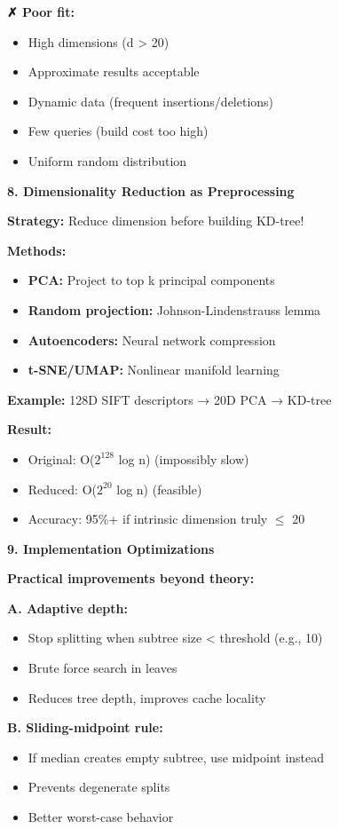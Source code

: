 \documentclass[12pt]{article}
\begin{document}
\begin{explanation}
\textbf{✗ Poor fit:}
\begin{itemize}
    \item High dimensions (d > 20)
    \item Approximate results acceptable
    \item Dynamic data (frequent insertions/deletions)
    \item Few queries (build cost too high)
    \item Uniform random distribution
\end{itemize}

\textbf{8. Dimensionality Reduction as Preprocessing}

\textbf{Strategy:} Reduce dimension before building KD-tree!

\textbf{Methods:}
\begin{itemize}
    \item \textbf{PCA:} Project to top k principal components
    \item \textbf{Random projection:} Johnson-Lindenstrauss lemma
    \item \textbf{Autoencoders:} Neural network compression
    \item \textbf{t-SNE/UMAP:} Nonlinear manifold learning
\end{itemize}

\textbf{Example:} 128D SIFT descriptors → 20D PCA → KD-tree

\textbf{Result:}
\begin{itemize}
    \item Original: O($2^{128}$ log n) (impossibly slow)
    \item Reduced: O($2^{20}$ log n) (feasible)
    \item Accuracy: 95\%+ if intrinsic dimension truly $\leq$ 20
\end{itemize}

\textbf{9. Implementation Optimizations}

\textbf{Practical improvements beyond theory:}

\textbf{A. Adaptive depth:}
\begin{itemize}
    \item Stop splitting when subtree size < threshold (e.g., 10)
    \item Brute force search in leaves
    \item Reduces tree depth, improves cache locality
\end{itemize}

\textbf{B. Sliding-midpoint rule:}
\begin{itemize}
    \item If median creates empty subtree, use midpoint instead
    \item Prevents degenerate splits
    \item Better worst-case behavior
\end{itemize}


\end{explanation}
\end{document}
